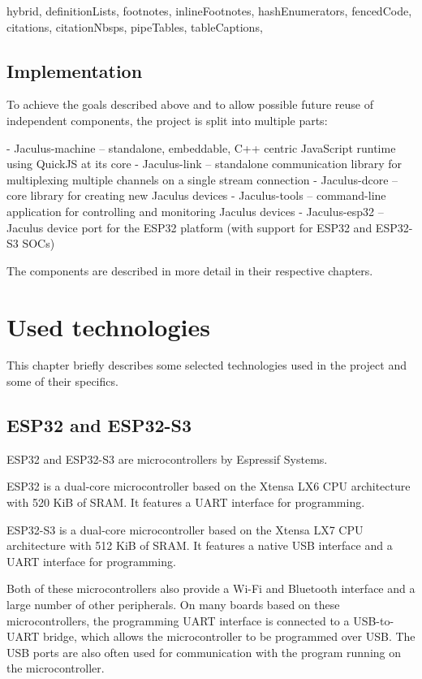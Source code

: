 \begin{markdown*}{%
  hybrid,
  definitionLists,
  footnotes,
  inlineFootnotes,
  hashEnumerators,
  fencedCode,
  citations,
  citationNbsps,
  pipeTables,
  tableCaptions,
}
\section{Implementation}

To achieve the goals described above and to allow possible future reuse of independent components, the project is split into multiple parts:

  - Jaculus-machine -- standalone, embeddable, C++ centric JavaScript runtime using QuickJS at its core
  - Jaculus-link -- standalone communication library for multiplexing multiple channels on a single stream connection
  - Jaculus-dcore -- core library for creating new Jaculus devices
  - Jaculus-tools -- command-line application for controlling and monitoring Jaculus devices
  - Jaculus-esp32 -- Jaculus device port for the ESP32 platform (with support for ESP32 and ESP32-S3 SOCs)

The components are described in more detail in their respective chapters.


\chapter{Used technologies}

This chapter briefly describes some selected technologies used in the project and some of their specifics.

\section{ESP32 and ESP32-S3}

ESP32 and ESP32-S3 are microcontrollers by Espressif Systems.

ESP32 is a dual-core microcontroller based on the Xtensa LX6 CPU architecture with 520 KiB of SRAM. It features a UART interface for programming.

ESP32-S3 is a dual-core microcontroller based on the Xtensa LX7 CPU architecture with 512 KiB of SRAM. It features a native USB interface and a UART interface for programming.

Both of these microcontrollers also provide a Wi-Fi and Bluetooth interface and a large number of other peripherals. On many boards based on these microcontrollers, the programming UART interface is connected to a USB-to-UART bridge, which allows the microcontroller to be programmed over USB. The USB ports are also often used for communication with the program running on the microcontroller.


\end{markdown*}
